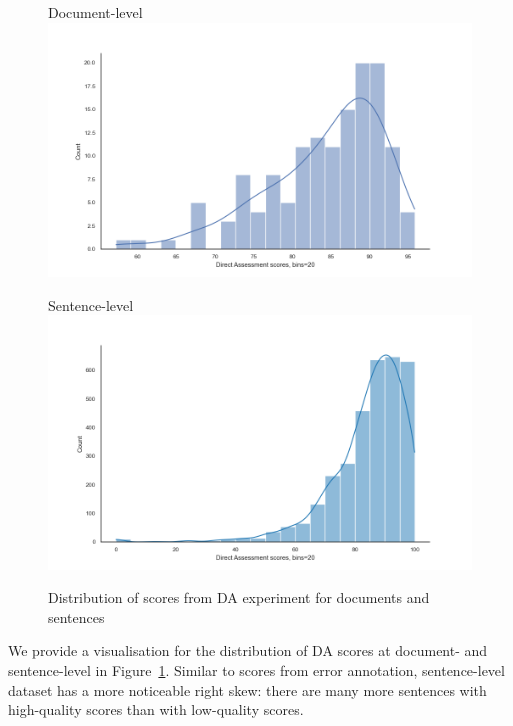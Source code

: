 \label{pg:da_score_hists}
\begin{figure}[H]
	\begin{minipage}[c]{0.5\linewidth}
		\centering
		Document-level
		\includegraphics[width=\linewidth]{figures/da/doc-da-score-distribution}
	\end{minipage}	
	\begin{minipage}[c]{0.5\linewidth}
		\centering
		Sentence-level
		\includegraphics[width=\linewidth]{figures/da/sent-da-score-distribution}
	\end{minipage}
	\caption{\label{fig:da_scores}Distribution of scores from DA experiment for documents and sentences}	
\end{figure}

We provide a visualisation for the distribution of DA scores at document- and sentence-level in Figure~\ref{fig:da_scores}. Similar to scores from error annotation, sentence-level dataset has a more noticeable right skew: there are many more sentences with high-quality scores than with low-quality scores. 


